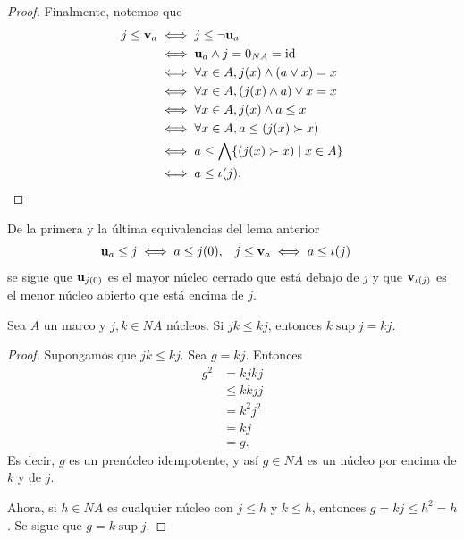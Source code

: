 \begin{proof}
    Finalmente, notemos que
    \begin{align}
      j\leq \mathbf v_{a}
      &\iff j\leq\neg\mathbf u_{a} \\
      &\iff \mathbf u_{a}\wedge j=0_{NA}=\mathrm{id} \\
      &\iff \forall x\in A, j(x)\wedge(a\vee x)=x \\
      &\iff \forall x\in A, (j(x)\wedge a)\vee x=x \\
      &\iff \forall x\in A, j(x)\wedge a\leq x \\
      &\iff \forall x\in A, a\leq (j(x)\succ x) \\
      &\iff a\leq\bigwedge\{(j(x)\succ x)\mid x\in A\} \\
      &\iff a\leq\iota(j),
    \end{align}
\end{proof}
\begin{corollary}
  De la primera y la última equivalencias del lema anterior
  \begin{align}
    \mathbf u_{a}\leq j &\iff a\leq j(0), &
    j\leq \mathbf v_{a} &\iff a\leq\iota(j)
  \end{align}
  se sigue que $\mathbf u_{j(0)}$ es el mayor núcleo cerrado que está
  debajo de $j$ y que $\mathbf v_{\iota(j)}$ es el menor núcleo abierto
  que está encima de $j$.
\end{corollary}

\begin{lemma}\label{lemma:sup-is-comp}
  Sea $A$ un marco y $j,k\in NA$ núcleos.
  Si $jk\leq kj$, entonces $k\sup j = kj$.
\end{lemma}
\begin{proof}
  Supongamos que $jk\leq kj$.
  Sea $g=kj$.
  Entonces
  \begin{align*}
    g^2
    &= kjkj \\
    &\leq kkjj \\
    &= k^2j^2 \\
    &= kj \\
    &= g.
  \end{align*}
  Es decir, $g$ es un prenúcleo idempotente, y así $g\in NA$
  es un núcleo por encima de $k$ y de $j$.

  Ahora, si $h\in NA$ es cualquier núcleo con $j\leq h$ y $k\leq
  h$, entonces $g=kj\leq h^2=h$.
  Se sigue que $g=k\sup j$.
\end{proof}

